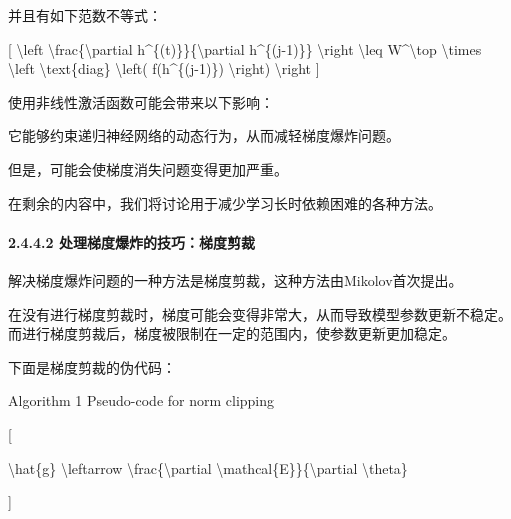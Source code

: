 
并且有如下范数不等式：

{[} \textbackslash left\textbar{}
\textbackslash frac\{\textbackslash partial
h\^{}\{(t)\}\}\{\textbackslash partial h\^{}\{(j-1)\}\}
\textbackslash right\textbar{} \textbackslash leq
\textbar{}W\^{}\textbackslash top\textbar{} \textbackslash times
\textbackslash left\textbar{} \textbackslash text\{diag\}
\textbackslash left( f\textquotesingle(h\^{}\{(j-1)\})
\textbackslash right) \textbackslash right\textbar{} {]}


使用非线性激活函数可能会带来以下影响：

它能够约束递归神经网络的动态行为，从而减轻梯度爆炸问题。

但是，可能会使梯度消失问题变得更加严重。

在剩余的内容中，我们将讨论用于减少学习长时依赖困难的各种方法。

\paragraph{\texorpdfstring{\textbf{2.4.4.2}
\textbf{处理梯度爆炸的技巧：梯度剪裁}}{2.4.4.2 处理梯度爆炸的技巧：梯度剪裁}}\label{2442-ux5904ux7406ux68afux5ea6ux7206ux70b8ux7684ux6280ux5de7ux68afux5ea6ux526aux88c1}

解决梯度爆炸问题的一种方法是梯度剪裁，这种方法由Mikolov首次提出。

在没有进行梯度剪裁时，梯度可能会变得非常大，从而导致模型参数更新不稳定。而进行梯度剪裁后，梯度被限制在一定的范围内，使参数更新更加稳定。


下面是梯度剪裁的伪代码：

Algorithm 1 Pseudo-code for norm clipping

{[}

\textbackslash hat\{g\} \textbackslash leftarrow
\textbackslash frac\{\textbackslash partial
\textbackslash mathcal\{E\}\}\{\textbackslash partial
\textbackslash theta\}

{]}


